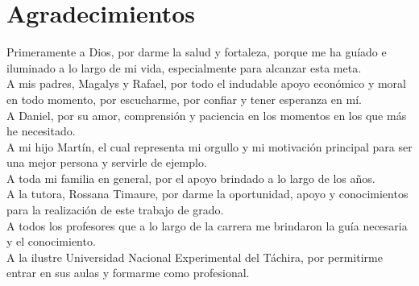 
\chapter*{Agradecimientos}


Primeramente  a Dios, por darme la salud y fortaleza, porque me ha gu\'iado e iluminado a lo largo de mi vida, especialmente para alcanzar esta meta.\\

A mis padres, Magalys y Rafael, por todo el indudable apoyo econ\'omico y moral en todo momento, por escucharme, por confiar y tener esperanza en m\'i.\\

A Daniel, por su amor, comprensi\'on y paciencia en los momentos en los que m\'as he necesitado. \\

A mi hijo Mart\'in, el cual representa mi orgullo y mi motivaci\'on principal para ser una mejor persona y servirle de ejemplo.\\

A toda mi familia en general, por el apoyo brindado a lo largo de los años.\\

A la tutora, Rossana Timaure, por darme la oportunidad, apoyo y conocimientos para la realizaci\'on de este trabajo de grado.\\

A todos los profesores que a lo largo de la carrera me brindaron la gu\'ia necesaria y el conocimiento.\\

A la ilustre Universidad Nacional Experimental del T\'achira, por permitirme entrar en sus aulas y formarme como profesional.
